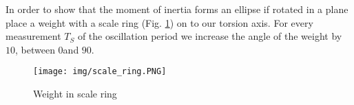 In order to show that the moment of inertia forms an ellipse if rotated in a plane place a weight with a scale ring (Fig. \ref{fig::ring}) on to our torsion axis.
For every measurement $T_S$ of the oscillation period we increase the angle of the weight by $10$\textdegree, between $0$\textdegree \space and $90$\textdegree.

\begin{figure} [ht]
	\centering
	\texttt{[image: img/scale\_ring.PNG]}
	\caption{Weight in scale ring \cite{website}}
	\label{fig::ring}
\end{figure}
